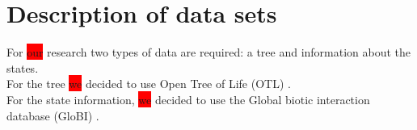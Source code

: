 
  \section{Description of data sets}
    For \colorbox{red}{our} research two types of data are required: a tree and information about the 
      states. \\
    For the tree \colorbox{red}{we} decided to use Open Tree of Life (OTL) \cite{Hinchliff2015}. \\
    For the state information, \colorbox{red}{we} decided to use the Global biotic interaction 
      database (GloBI) \cite{Poelen2014}.

